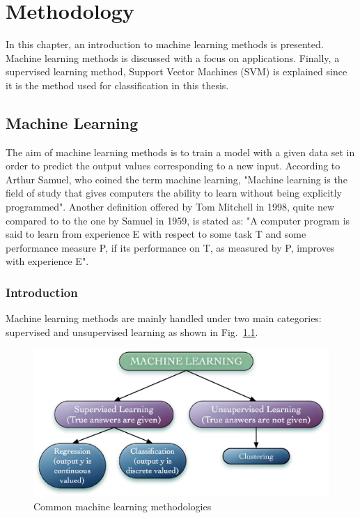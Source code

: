 \chapter{Methodology}

In this chapter, an introduction to machine learning methods is presented. 
Machine learning methods is discussed with a focus on applications.
Finally, a supervised learning method, Support Vector Machines (SVM) is explained since it is the method used for classification in this thesis.

\section{Machine Learning}

The aim of machine learning methods is to train a model with a given data set in order to predict the output values corresponding to a new input. 
According to Arthur Samuel, who coined the term machine learning, "Machine learning is the field of study that gives computers the ability to learn without being explicitly programmed". 
Another definition offered by Tom Mitchell in 1998, quite new compared to to the one by Samuel in 1959, is stated as: "A computer program is said to learn from experience E with respect to some task T and some performance measure P, if its performance on T, as measured by P, improves with experience E".

\subsection{Introduction}
Machine learning methods are mainly handled under two main categories: supervised and unsupervised learning as shown in Fig.~\ref{fig:machineLearningMethodsSerious}. 

\begin{figure}
\begin{center}
\includegraphics[width=14cm]{figures/machineLearningMethodsSerious}    %
\caption{Common machine learning methodologies} 
\label{fig:machineLearningMethodsSerious}
\end{center}
\end{figure}

